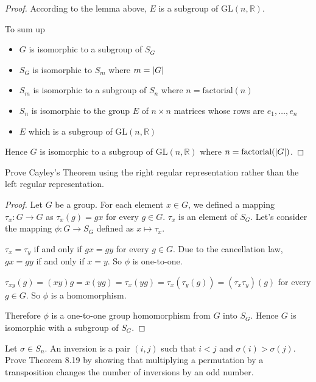 \begin{proof}
    According to the lemma above, $E$ is a subgroup of $\text{GL}(n, \mathbb{R})$.

    To sum up
    \begin{itemize}
        \item $G$ is isomorphic to a subgroup of $S_{G}$
        \item $S_{G}$ is isomorphic to $S_{m}$ where $m = \left\vert{G}\right\vert$
        \item $S_{m}$ is isomorphic to a subgroup of $S_{n}$ where $n = \text{factorial}(n)$
        \item $S_{n}$ is isomorphic to the group $E$ of $n\times n$ matrices whose rows are $e_{1},\ldots, e_{n}$
        \item $E$ which is a subgroup of $\text{GL}(n, \mathbb{R})$
    \end{itemize}

    Hence $G$ is isomorphic to a subgroup of $\text{GL}(n, \mathbb{R})$ where $n = \text{factorial}(\left\vert{G}\right\vert)$.
\end{proof}

\newpage
\begin{exercise}
    Prove Cayley's Theorem using the right regular representation rather than the left regular representation.
\end{exercise}

\begin{proof}
    Let $G$ be a group. For each element $x\in G$, we defined a mapping $\tau_{x}: G\to G$ as $\tau_{x}(g) = gx$ for every $g\in G$. $\tau_{x}$ is an element of $S_{G}$. Let's consider the mapping $\phi: G\to S_{G}$ defined as $x\mapsto \tau_{x}$.

    $\tau_{x} = \tau_{y}$ if and only if $gx = gy$ for every $g\in G$. Due to the cancellation law, $gx = gy$ if and only if $x = y$. So $\phi$ is one-to-one.

    $\tau_{xy}(g) = (xy)g = x(yg) = \tau_{x}(yg) = \tau_{x}(\tau_{y}(g)) = (\tau_{x}\tau_{y})(g)$ for every $g\in G$. So $\phi$ is a homomorphism.

    Therefore $\phi$ is a one-to-one group homomorphism from $G$ into $S_{G}$. Hence $G$ is isomorphic with a subgroup of $S_{G}$.
\end{proof}

\newpage
\begin{exercise}
    Let $\sigma\in S_{n}$. An inversion is a pair $(i, j)$ such that $i < j$ and $\sigma(i) > \sigma(j)$. Prove Theorem 8.19 by showing that multiplying a permutation by a transposition changes the number of inversions by an odd number.
\end{exercise}

